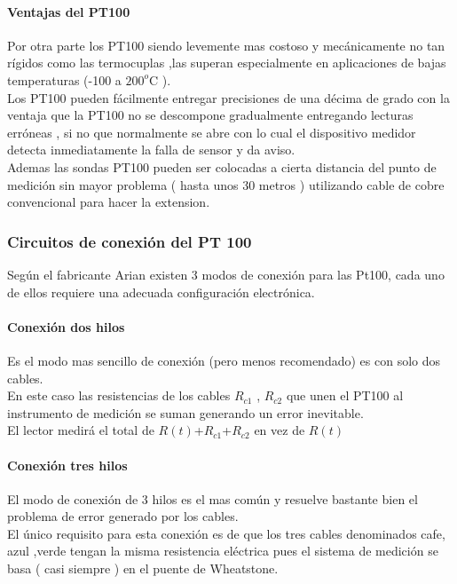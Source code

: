 \documentclass[Spanish,12pt,doublespace,german,letterpaper,dvipdfm]{article}
\begin{document}
\paragraph{Ventajas del PT100} Por otra parte los PT100 siendo levemente
mas costoso y mecánicamente no tan rígidos como las termocuplas
,las superan especialmente en aplicaciones de bajas temperaturas
(-100 a
$200^{o}$C ).\\
Los PT100 pueden fácilmente entregar precisiones de una décima de
grado con la ventaja que la PT100 no se descompone gradualmente
entregando lecturas erróneas , si no que normalmente se abre con
lo cual el dispositivo medidor detecta inmediatamente la falla de
sensor y da aviso.\\
Ademas las sondas PT100 pueden ser colocadas a cierta distancia
del punto de medici\'on sin mayor problema  ( hasta unos 30 metros
) utilizando cable de cobre convencional para hacer la extension.


\subsubsection{Circuitos de conexión del PT 100} Según el fabricante Arian
existen 3 modos de conexión para las Pt100, cada uno de ellos
requiere una adecuada configuraci\'on electr\'onica.

\paragraph{Conexión dos hilos}
Es el modo mas sencillo de conexi\'on (pero menos recomendado) es
con solo dos cables.\\En este caso las resistencias de los cables
$R_{c1}$ , $R_{c2}$ que unen el PT100 al instrumento de medici\'on
se suman generando un
error inevitable.\\
El lector medirá el total de $R(t)$+$R_{c1}$+$R_{c2}$ en vez de
$R(t)$

\paragraph{Conexión tres hilos} El modo de conexión de 3
hilos es el mas común y resuelve bastante bien el problema de
error generado por los cables.\\
El único requisito para esta conexi\'on es de que los tres cables
denominados cafe, azul ,verde tengan la misma resistencia
eléctrica pues el sistema de medici\'on se basa ( casi siempre )
en el puente de Wheatstone.
\end{document}
